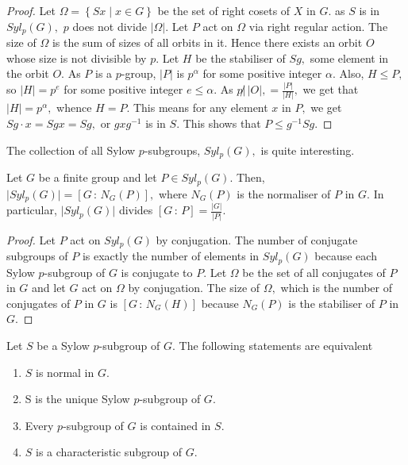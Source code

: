 \begin{proof}
	Let $ \Omega  =  \left\{ S x \; | \; x \in G  \right\}$
	be the set of right cosets of $X$ in $G.$
	as $S$ is in $Syl_p(G),$ $p$ does not divide $ \lvert \Omega
	\rvert.$
	Let $P$ act on $ \Omega $ via right regular  action.
	The size of $ \Omega $ is the sum of sizes of all orbits in it. 
	Hence there exists an orbit $O$ whose size is not divisible by $p.$
	Let $H$ be the stabiliser of $Sg,$ some element in the
	orbit $O.$
	As $P$ is a $p$\nobreakdash-group, $ \lvert P \rvert$
	is $p^\alpha$ for some positive integer $\alpha.$
	Also, $H \leq P,$ so $ \lvert H \rvert = p^e$ for some positive
	integer $e \leq \alpha.$
	As $p \not | \, \lvert O \rvert, = 
	\frac{ \lvert P \rvert}{ \lvert H \rvert},$ we get that
	$ \lvert H \rvert = p^ \alpha,$ whence $H = P.$ This means
	for any element $x$ in $P,$ we get $Sg \cdot x = Sgx = Sg,$
	or $g x g^{-1}$ is in $S.$ This shows that $P \leq g^{-1} S g.$
	\end{proof}

The collection of all Sylow $p$\nobreakdash-subgroups, $Syl_p(G),$ is quite interesting.

\begin{corollary} \label{cor:number-of-sylow-p-groups}
	Let $G$ be a finite group and let $P \in Syl_p(G).$ Then, $ \lvert Syl_p(G) \rvert 
	= \left[ G \, : \, N_G(P) \right] ,$
	where $N_G(P) $ is the normaliser of $P$ in $G.$
	In particular, $ \lvert Syl_p(G) \rvert $ divides $ \left[ G \, : \, P \right] 
	= \frac{ \lvert G \rvert } { \lvert P \rvert }.$
\end{corollary}

\begin{proof}
	Let $P$ act on $Syl_p(G)$ by conjugation.
	The number of conjugate subgroups of $P$ is exactly the number of 
	elements in $Syl_p(G)$
	because each Sylow $p$\nobreakdash-subgroup of $G$ is conjugate to $P.$
	Let $ \Omega$ be the set of all conjugates of $P$ in $G$ and let 
	$G$ act on $ \Omega$ by conjugation.
	The size of $ \Omega ,$ which is the number of conjugates of $P$ in $G$ 
	is $ \left[ G \, : \, N_G(H) \right] $ because $N_G(P) $ is the
	stabiliser of $P$ in $G.$
\end{proof}

\begin{corollary}
	Let $ S$ be a Sylow $p$\nobreakdash-subgroup of $G.$
	The following statements are equivalent
	\begin{enumerate}
		\item $S$ is normal in $G.$
		\item S is the unique Sylow $p$\nobreakdash-subgroup of $G.$
		\item Every $p$\nobreakdash-subgroup of $G$ is contained in $S.$
		\item $S$ is a characteristic subgroup of $G.$
	\end{enumerate}
\end{corollary}


